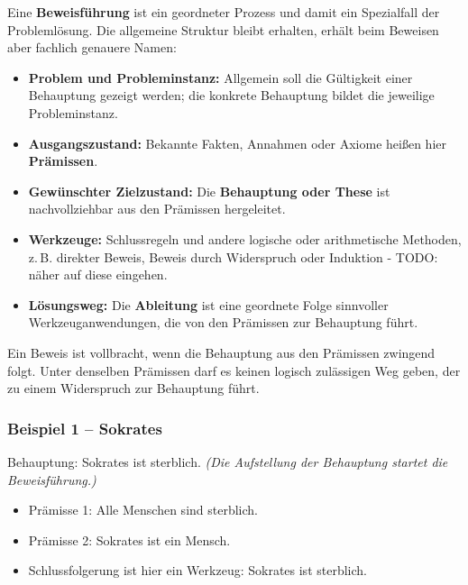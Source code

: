 \documentclass{article}
\begin{document}
        Eine \textbf{Beweisführung} ist ein geordneter Prozess und damit ein Spezialfall der Problemlösung. Die allgemeine Struktur bleibt erhalten, erhält beim Beweisen aber fachlich genauere Namen:
      

      \begin{itemize}
        \item \textbf{Problem und Probleminstanz:} Allgemein soll die Gültigkeit einer Behauptung gezeigt werden; die konkrete Behauptung bildet die jeweilige Probleminstanz.

        \item \textbf{Ausgangszustand:} Bekannte Fakten, Annahmen oder Axiome heißen hier \textbf{Prämissen}.

        \item \textbf{Gewünschter Zielzustand:} Die \textbf{Behauptung oder These} ist nachvollziehbar aus den Prämissen hergeleitet.

        \item \textbf{Werkzeuge:} Schlussregeln und andere logische oder arithmetische Methoden, z.\,B. direkter Beweis, Beweis durch Widerspruch oder Induktion - TODO: näher auf diese eingehen.

        \item \textbf{Lösungsweg:} Die \textbf{Ableitung} ist eine geordnete Folge sinnvoller Werkzeuganwendungen, die von den Prämissen zur Behauptung führt.

      \end{itemize}

      Ein Beweis ist vollbracht, wenn die Behauptung aus den Prämissen zwingend folgt. Unter denselben Prämissen darf es keinen logisch zulässigen Weg geben, der zu einem Widerspruch zur Behauptung führt.

      \subsubsection{Beispiel 1 – Sokrates}
      

        Behauptung: Sokrates ist sterblich. \emph{(Die Aufstellung der Behauptung startet die Beweisführung.)}
      

      \begin{itemize}
        \item Prämisse 1: Alle Menschen sind sterblich.

        \item Prämisse 2: Sokrates ist ein Mensch.

        \item Schlussfolgerung ist hier ein Werkzeug: Sokrates ist sterblich.

      \end{itemize}
      
\end{document}
